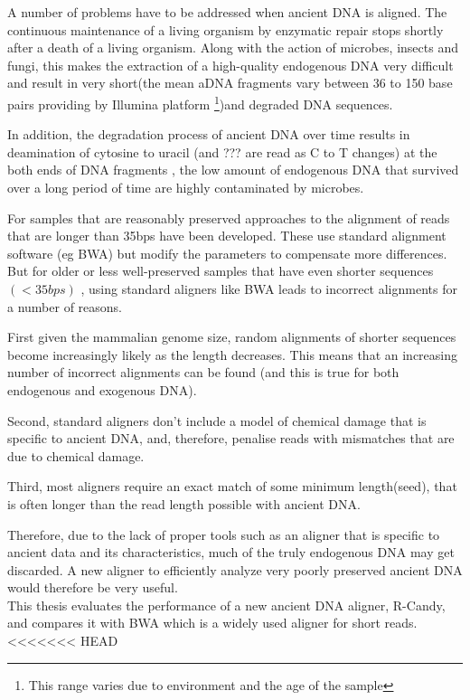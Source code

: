 \documentclass[11pt,a4paper]{report}
\begin{document}
A number of problems have to be addressed when ancient DNA is aligned.
The continuous maintenance of a living organism by enzymatic repair stops 
shortly after a death of a living organism. Along with the action of
microbes, insects and fungi, this makes the extraction of a 
high-quality endogenous DNA very difficult and result in very short(the 
mean aDNA fragments vary between 36 to 150 base pairs providing by Illumina 
platform\cite{rizzi2012ancient} \footnote{This range varies due to environment 
and the age of the sample})and degraded DNA sequences\cite{paabo2004genetic}.
 
In addition, the degradation process of ancient DNA over time results 
in deamination of cytosine to uracil (and ??? are read as C to T 
changes) at the both ends of DNA fragments \cite{futureofaDNA}, the low amount 
of endogenous DNA that survived over a long period of time  
are highly contaminated \cite{paabo2004genetic}\cite{aDNA}by microbes.

For samples that are reasonably preserved approaches to the alignment
of reads that are longer than 35bps have been developed. 
These use standard alignment software (eg BWA) but modify the parameters 
to compensate more differences.
But for older or less well-preserved samples that have even shorter 
sequences $(<35 bps)$ \cite{meyer2014mitochondrial},
using standard aligners like BWA leads to incorrect alignments for a 
number of reasons.

First given the mammalian genome size, random alignments of shorter 
sequences become increasingly likely as the length decreases. 
This means that an increasing number of incorrect alignments can be 
found (and this is true for both endogenous and exogenous DNA).

Second, standard aligners don't include a model of chemical damage that 
is specific to ancient DNA, and, therefore, penalise reads with mismatches
that are due to chemical damage.

Third, most aligners require an exact match of some minimum length(seed), 
that is often longer than the read length possible with ancient DNA.

Therefore, due to the lack of proper tools such as an aligner that is 
specific to ancient data and its characteristics, much of the truly 
endogenous DNA may get discarded. A new aligner to efficiently analyze 
very poorly preserved ancient DNA would therefore be very useful.
\\
This thesis evaluates the performance of a new ancient DNA aligner,
R-Candy, and compares it with BWA which is a widely used aligner for
short reads.
<<<<<<< HEAD
\end{document}
